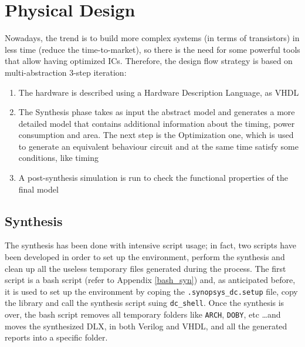 \chapter{Physical Design}
Nowadays, the trend is to build more complex systems (in terms of transistors) in less time (reduce the time-to-market), so there is the need for some powerful tools that allow having optimized ICs. Therefore, the design flow strategy is based on multi-abstraction 3-step iteration:
\begin{enumerate}
    \item The hardware is described using a Hardware Description Language, as VHDL
    \item The Synthesis phase takes as input the abstract model and generates a more detailed model that contains additional information about the timing, power consumption and area. The next step is the Optimization one, which is used to generate an equivalent behaviour circuit and at the same time satisfy some conditions, like timing
    \item A post-synthesis simulation is run to check the functional properties of the final model
\end{enumerate}
\section{Synthesis}
\label{sec:syn_opt}
The synthesis has been done with intensive script usage; in fact, two scripts have been developed in order to set up the environment, perform the synthesis and clean up all the useless temporary files generated during the process.\newline\newline
The first script is a bash script (refer to Appendix \ref{bash_syn}) and, as anticipated before, it is used to set up the environment by coping the \texttt{.synopsys\_dc.setup} file, copy the library and call the synthesis script suing \texttt{dc\_shell}.
Once the synthesis is over, the bash script removes all temporary folders like \texttt{ARCH}, \texttt{DOBY}, etc \dots and moves the synthesized DLX, in both Verilog and VHDL, and all the generated reports into a specific folder.\newline\newline

